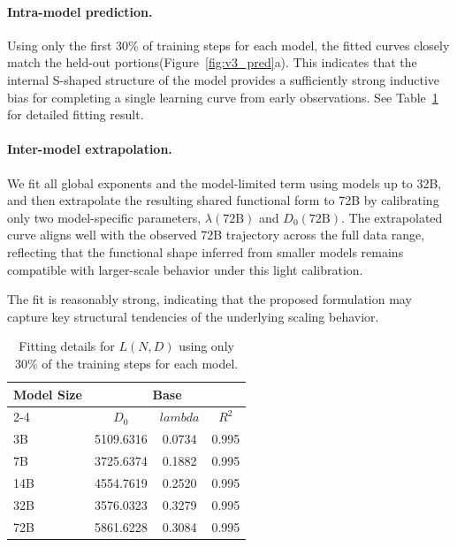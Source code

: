 \paragraph{Intra-model prediction.}
Using only the first 30\% of training steps for each model, the fitted curves closely match the held-out portions(Figure~\ref{fig:v3_pred}a). This indicates that the internal S-shaped structure of the model provides a sufficiently strong inductive bias for completing a single learning curve from early observations. See Table~\ref{tab:fit_v3_intra} for detailed fitting result.

\paragraph{Inter-model extrapolation.}
We fit all global exponents and the model-limited term using models up to 32B, and then extrapolate the resulting shared functional form to 72B by calibrating only two model-specific parameters, $\lambda(72\text{B})$ and $D_0(72\text{B})$.
The extrapolated curve aligns well with the observed 72B trajectory across the full data range, reflecting that the functional shape inferred from smaller models remains compatible with larger-scale behavior under this light calibration.

The fit is reasonably strong, indicating that the proposed formulation may capture key structural tendencies of the underlying scaling behavior.


\begin{table}[H]
\centering
\caption{Fitting details for $L(N,D)$ using only 30\% of the training steps for each model.}
\label{tab:fit_v3_intra}
\begin{tabular}{lccc}
\toprule
\multirow{2}{*}{\textbf{Model Size}} & \multicolumn{3}{c}{\textbf{Base}} \\
\cmidrule(lr){2-4}
 & $D_0$ & $lambda$ & $R^2$ \\
\midrule
3B & 5109.6316 & 0.0734 & 0.995 \\
7B & 3725.6374 & 0.1882 & 0.995 \\
14B & 4554.7619 & 0.2520 & 0.995 \\
32B & 3576.0323 & 0.3279 & 0.995 \\
72B & 5861.6228 & 0.3084 & 0.995 \\
\bottomrule
\end{tabular}
\end{table}




